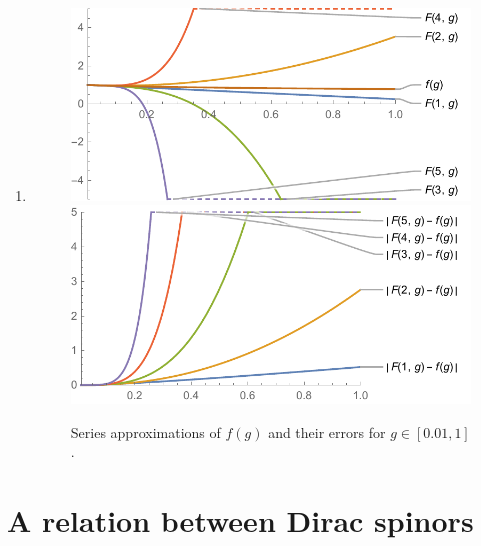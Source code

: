 \documentclass[10pt,a4paper]{article}
\begin{document}
\begin{enumerate}
\item \begin{figure}
\centering
\includegraphics[width=0.44 \textwidth]{approx_series}
\hspace{0.1\textwidth}
\includegraphics[width=0.44 \textwidth]{error_series}
\caption{Series approximations of $f(g)$ and their errors for $g \in [0.01, 1]$.}
\end{figure}

\end{enumerate}


\section{A relation between Dirac spinors}
\end{document}

